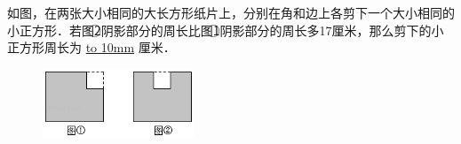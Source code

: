 \item {
    {如图，在两张大小相同的大长方形纸片上，分别在角和边上各剪下一个大小相同的小正方形．若图\textcircled{2}阴影部分的周长比图\textcircled{1}阴影部分的周长多17厘米，那么剪下的小正方形周长为 \underline{\hbox to 10mm{}} 厘米．} \\
    \begin{figure}[H] 
        \centering
        \includegraphics[width=0.4\textwidth]{./pics/Chapter_3/15.png}
    \end{figure}
    \vspace{1cm}
}
